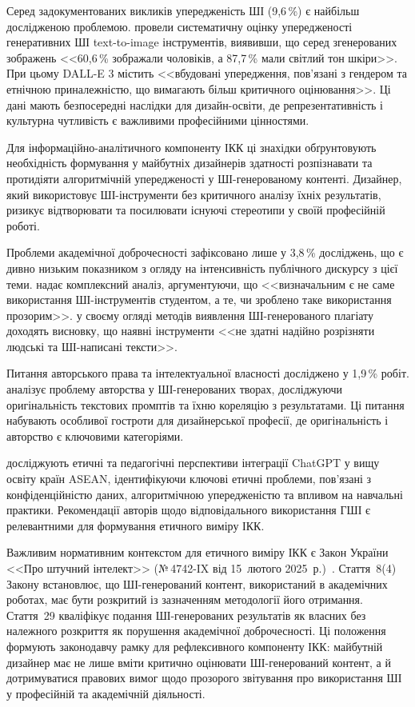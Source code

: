 Серед задокументованих викликів упередженість ШІ (9,6\,\%) є найбільш дослідженою проблемою. \citet{Currie2024} провели систематичну оцінку упередженості генеративних ШІ text-to-image інструментів, виявивши, що серед згенерованих зображень <<60,6\,\% зображали чоловіків, а 87,7\,\% мали світлий тон шкіри>>. При цьому DALL-E 3 містить <<вбудовані упередження, пов'язані з гендером та етнічною приналежністю, що вимагають більш критичного оцінювання>>. Ці дані мають безпосередні наслідки для дизайн-освіти, де репрезентативність і культурна чутливість є важливими професійними цінностями.

Для інформаційно-аналітичного компоненту ІКК ці знахідки обґрунтовують необхідність формування у майбутніх дизайнерів здатності розпізнавати та протидіяти алгоритмічній упередженості у ШІ-генерованому контенті. Дизайнер, який використовує ШІ-інструменти без критичного аналізу їхніх результатів, ризикує відтворювати та посилювати існуючі стереотипи у своїй професійній роботі.

Проблеми академічної доброчесності зафіксовано лише у 3,8\,\% досліджень, що є дивно низьким показником з огляду на інтенсивність публічного дискурсу з цієї теми. \citet{Perkins2023} надає комплексний аналіз, аргументуючи, що <<визначальним є не саме використання ШІ-інструментів студентом, а те, чи зроблено таке використання прозорим>>. \citet{Pudasaini2025} у своєму огляді методів виявлення ШІ-генерованого плагіату доходять висновку, що наявні інструменти <<не здатні надійно розрізняти людські та ШІ-написані тексти>>.

Питання авторського права та інтелектуальної власності досліджено у 1,9\,\% робіт. \citet{Mazzi2024} аналізує проблему авторства у ШІ-генерованих творах, досліджуючи оригінальність текстових промптів та їхню кореляцію з результатами. Ці питання набувають особливої гостроти для дизайнерської професії, де оригінальність і авторство є ключовими категоріями.

\citet{Buragohain2025} досліджують етичні та педагогічні перспективи інтеграції ChatGPT у вищу освіту країн ASEAN, ідентифікуючи ключові етичні проблеми, пов'язані з конфіденційністю даних, алгоритмічною упередженістю та впливом на навчальні практики. Рекомендації авторів щодо відповідального використання ГШІ є релевантними для формування етичного виміру ІКК.

Важливим нормативним контекстом для етичного виміру ІКК є Закон України <<Про штучний інтелект>> (№\,4742-IX від 15~лютого 2025~р.)~\cite{ZakonAI2025}. Стаття~8(4) Закону встановлює, що ШІ-генерований контент, використаний в академічних роботах, має бути розкритий із зазначенням методології його отримання. Стаття~29 кваліфікує подання ШІ-генерованих результатів як власних без належного розкриття як порушення академічної доброчесності. Ці положення формують законодавчу рамку для рефлексивного компоненту ІКК: майбутній дизайнер має не лише вміти критично оцінювати ШІ-генерований контент, а й дотримуватися правових вимог щодо прозорого звітування про використання ШІ у професійній та академічній діяльності.

